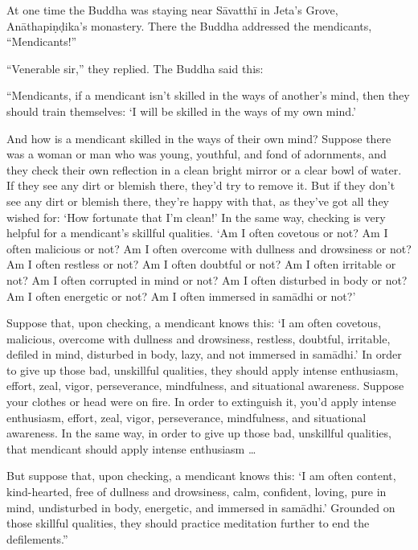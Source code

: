 \documentclass[12pt,openany]{book}%
\begin{document}
At one time the Buddha was staying near \textsanskrit{Sāvatthī} in Jeta’s Grove, \textsanskrit{Anāthapiṇḍika}’s monastery. There the Buddha addressed the mendicants, “Mendicants!” 

“Venerable sir,” they replied. The Buddha said this: 

“Mendicants, if a mendicant isn’t skilled in the ways of another’s mind, then they should train themselves: ‘I will be skilled in the ways of my own mind.’ 

And how is a mendicant skilled in the ways of their own mind? Suppose there was a woman or man who was young, youthful, and fond of adornments, and they check their own reflection in a clean bright mirror or a clear bowl of water. If they see any dirt or blemish there, they’d try to remove it. But if they don’t see any dirt or blemish there, they’re happy with that, as they’ve got all they wished for: ‘How fortunate that I’m clean!’ In the same way, checking is very helpful for a mendicant’s skillful qualities. ‘Am I often covetous or not? Am I often malicious or not? Am I often overcome with dullness and drowsiness or not? Am I often restless or not? Am I often doubtful or not? Am I often irritable or not? Am I often corrupted in mind or not? Am I often disturbed in body or not? Am I often energetic or not? Am I often immersed in \textsanskrit{samādhi} or not?’ 

Suppose that, upon checking, a mendicant knows this: ‘I am often covetous, malicious, overcome with dullness and drowsiness, restless, doubtful, irritable, defiled in mind, disturbed in body, lazy, and not immersed in \textsanskrit{samādhi}.’ In order to give up those bad, unskillful qualities, they should apply intense enthusiasm, effort, zeal, vigor, perseverance, mindfulness, and situational awareness. Suppose your clothes or head were on fire. In order to extinguish it, you’d apply intense enthusiasm, effort, zeal, vigor, perseverance, mindfulness, and situational awareness. In the same way, in order to give up those bad, unskillful qualities, that mendicant should apply intense enthusiasm … 

But suppose that, upon checking, a mendicant knows this: ‘I am often content, kind-hearted, free of dullness and drowsiness, calm, confident, loving, pure in mind, undisturbed in body, energetic, and immersed in \textsanskrit{samādhi}.’ Grounded on those skillful qualities, they should practice meditation further to end the defilements.” 
\end{document}
